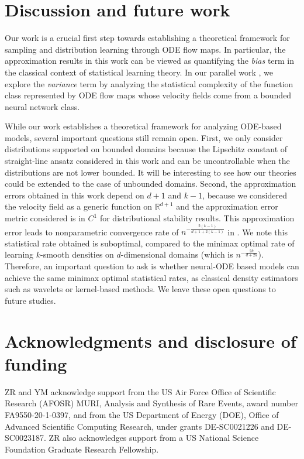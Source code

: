 

\section{Discussion and future work}
Our work is a crucial first step towards establishing a theoretical framework for sampling and distribution learning through ODE flow maps. In particular, the approximation results in this work can be viewed as quantifying the \textit{bias} term in the classical context of statistical learning theory. In our parallel work \cite{StatisticalNODE}, we explore the \textit{variance} term by analyzing the statistical complexity of the function class represented by ODE flow maps whose velocity fields come from a bounded neural network class. 

While our work establishes a theoretical framework for analyzing ODE-based models, several important questions still remain open. First, we only consider distributions supported on bounded domains because the Lipschitz constant of straight-line ansatz considered in this work and \cite{StatisticalNODE} can be uncontrollable when the distributions are not lower bounded. It will be interesting to see how our theories could be extended to the case of unbounded domains. Second, the approximation errors obtained in this work depend on $d+1$ and $k-1$, because we considered the velocity field as a generic function on $\mathbb{R}^{d+1}$ and the approximation error metric considered is in $C^1$ for distributional stability results. This approximation error leads to nonparametric convergence rate of $n^{-\frac{2(k-1)}{d+1 + 2(k-1)}}$ in \cite{StatisticalNODE}. We note this statistical rate obtained is suboptimal, compared to the minimax optimal rate of learning $k$-smooth densities on $d$-dimensional domains (which is $n^{-\frac{2k}{d + 2k}}$). Therefore, an important question to ask is whether neural-ODE based models can achieve the same minimax optimal statistical rates, as classical density estimators such as wavelets or kernel-based methods. We leave these open questions to future studies. 


\section*{Acknowledgments and disclosure of funding}
ZR and YM acknowledge support from the US Air Force Office of Scientific Research (AFOSR) MURI, Analysis and Synthesis of Rare Events, award number FA9550-20-1-0397, and from the US Department of Energy (DOE), Office of Advanced Scientific Computing Research, under grants DE-SC0021226 and DE-SC0023187. ZR also acknowledges support from a US National Science Foundation Graduate Research Fellowship.















